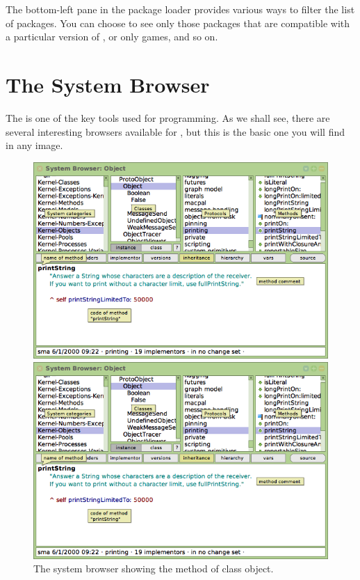 \documentclass[a4paper,10pt,twoside]{book}
\begin{document}
The bottom-left pane in the \sqmap package loader provides various ways to filter the list of packages.   You can choose to see only those packages that are compatible with a particular version of \sq, or only games, and so on.

\section{The System Browser}

The  is one of the key tools used for programming.
As we shall see, there are several interesting browsers available for \sq, but this is the basic one you will find in any image.


\begin{figure}[htb]
\ifluluelse
	{\centerline {\includegraphics[width=\textwidth]{ClassBrowser2}}}
	{\centerline {\includegraphics[scale=0.7]{ClassBrowser2}}}
\caption{The system browser showing the  method of class object.
\label{fig:classBrowser}}
\end{figure}
\end{document}
